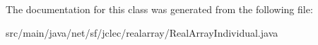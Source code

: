 The documentation for this class was generated from the following file\-:\begin{DoxyCompactItemize}
\item 
src/main/java/net/sf/jclec/realarray/Real\-Array\-Individual.\-java\end{DoxyCompactItemize}
